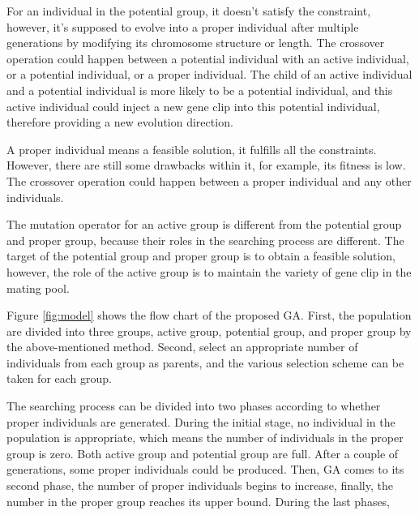For an individual in the potential group, it doesn't satisfy the constraint,
however, it's supposed to evolve into a proper individual after multiple
generations by modifying its chromosome structure or length. The crossover
operation could happen between a potential individual with an active
individual, or a potential individual, or a proper individual. The child of an
active individual and a potential individual is more likely to be a potential individual,
and this active individual could inject a new gene clip into this potential
individual, therefore providing a new evolution direction. 


A proper individual means a feasible solution, it fulfills all the constraints. 
However, there are still some drawbacks within it, for example, its fitness is low.
The crossover operation could happen between a proper individual and any other individuals.


The mutation operator for an active group is different from the potential group
and proper group, because their roles in the searching process are different.
The target of the potential group and proper group is to obtain a feasible
solution, however, the role of the active group is to maintain the variety of gene
clip in the mating pool. 

Figure \ref{fig:model} shows the flow chart of the proposed GA. First, the
population are divided into three groups, active group, potential group, and
proper group by the above-mentioned method. Second, select an appropriate number of
individuals from each group as parents, and the various selection scheme can be
taken for each group. 


The searching process can be divided into two phases according to whether
proper individuals are generated.  During the initial stage, no individual in
the population is appropriate, which means the number of individuals in the
proper group is zero. Both active group and potential group are full. After a
couple of generations, some proper individuals could be produced. Then, GA
comes to its second phase, the number of proper individuals begins to increase,
finally, the number in the proper group reaches its upper bound. During the
last phases, 


